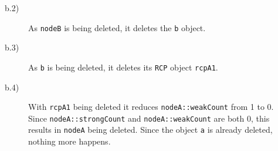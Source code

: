\documentclass[pdf,ps2pdf,11pt]{SANDreport}
\begin{document}
\begin{description}
\begin{description}
  {}\item[b.2)] As {}\texttt{nodeB} is being deleted, it deletes the
  {}\texttt{b} object.

  {}\item[b.3)] As {}\texttt{b} is being deleted, it deletes its
  {}\texttt{RCP} object {}\texttt{rcpA1}.

  {}\item[b.4)] With {}\texttt{rcpA1} being deleted it reduces
  {}\texttt{nodeA::weakCount} from 1 to 0.  Since
  {}\texttt{nodeA::strongCount} and {}\texttt{nodeA::weakCount} are
  both 0, this results in {}\texttt{nodeA} being deleted.  Since the
  object {}\texttt{a} is already deleted, nothing more happens.

  \end{description}

\end{description}
\end{document}

